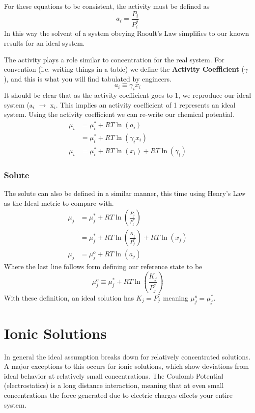 \documentclass{article}
\newcommand{\be}{\begin{equation}}
\newcommand{\ee}{\end{equation}}
\begin{document}
For these equations to be consistent, the activity must be defined as 
\be
a_i = \frac{P_i}{P_i^*}
\ee
In this way the solvent of a system obeying Raoult's Law simplifies to our known results for an ideal system. 

The activity plays a role similar to concentration for the real system. 
For convention (i.e. writing things in a table) we define the \textbf{Activity Coefficient} ($\gamma$), and this is what you will find  tabulated by engineers.
\be
a_i \equiv \gamma_i x_i
\ee
It should be clear that as the activity coefficient goes to 1, we reproduce our ideal system (a$_i$ $\rightarrow$ x$_i$. 
This implies an activity coefficient of 1 represents an ideal system. 
Using the activity coefficient we can re-write our chemical potential.
\be
\begin{split}
\mu_i &= \mu_i^* + RT \ln(a_i)\\
&= \mu_i^* + RT \ln(\gamma_i x_i)\\
\mu_i &= \mu_i^* + RT\ln(x_i) + RT \ln(\gamma_i)
\end{split}
\ee

\subsubsection*{Solute}
The solute can also be defined in a similar manner,  this time using Henry's Law as the Ideal metric to compare with. 
\be
\begin{split}
\mu_j &= \mu_j^* + RT\ln\left(\frac{P_j}{P_j^*}\right)\\
&= \mu_j^* + RT\ln\left(\frac{K_j}{P_j^*}\right) + RT\ln(x_j)\\
\mu_j &= \mu_j^o + RT\ln(a_j)
\end{split}
\ee
Where the last line follows form defining our reference state to be
\be
\mu_j^o \equiv \mu_j^* + RT\ln\left(\frac{K_j}{P_j^*}\right)
\ee
With these definition, an ideal solution has $K_j = P_j^*$ meaning $\mu_j^o = \mu_j^*$. 

\section*{Ionic Solutions}
In general the ideal assumption breaks down for relatively concentrated solutions. 
A major exceptions to this occurs for ionic solutions, which show deviations from ideal behavior at relatively small concentrations. 
The Coulomb Potential (electrostatics) is a long distance interaction, meaning that at even small concentrations the force generated due to electric charges effects your entire system. 
\end{document}
